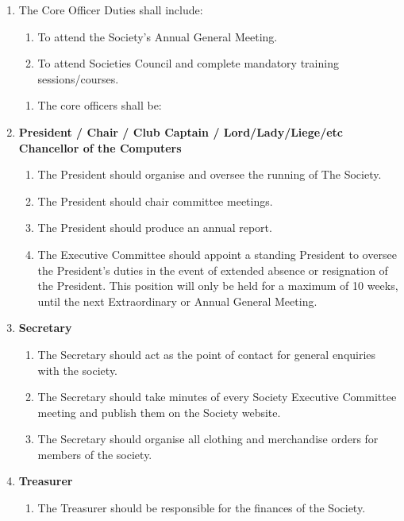 \documentclass{article}
\begin{document}
\begin{enumerate}
    \begin{enumerate}
        \item The Core Officer Duties shall include:
        \begin{enumerate}
            \item To attend the Society's Annual General Meeting.
            \item To attend Societies Council and complete mandatory training sessions/courses.
        \end{enumerate}
        \begin{enumerate}[leftmargin=-1cm]
            \item[] The core officers shall be:
        \end{enumerate}
        \item \textbf{President / Chair / Club Captain / Lord/Lady/Liege/etc Chancellor of the Computers}
        \begin{enumerate}
            \item The President should organise and oversee the running of The Society.
            \item The President should chair committee meetings.
            \item The President should produce an annual report.
            \item The Executive Committee should appoint a standing President to oversee the President's duties in the event of extended absence or resignation of the President. This position will only be held for a maximum of 10 weeks, until the next Extraordinary or Annual General Meeting.
        \end{enumerate}
        \item \textbf{Secretary}
        \begin{enumerate}
            \item The Secretary should act as the point of contact for general enquiries with the society.
            \item The Secretary should take minutes of every Society Executive Committee meeting and publish them on the Society website.
            \item The Secretary should organise all clothing and merchandise orders for members of the society.
        \end{enumerate}
        \item \textbf{Treasurer}
        \begin{enumerate}
            \item The Treasurer should be responsible for the finances of the Society.

\end{enumerate}
\end{enumerate}
\end{enumerate}
\end{document}
